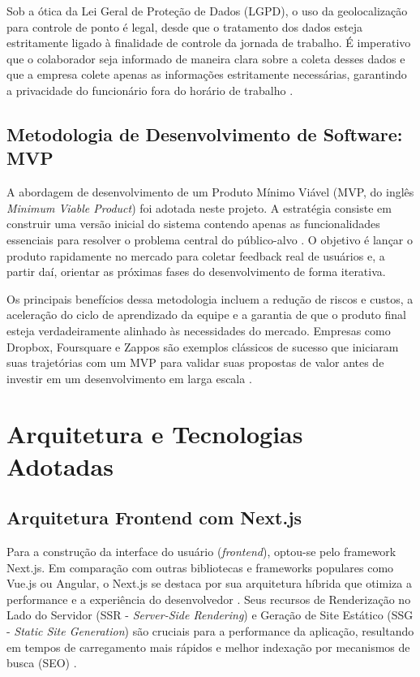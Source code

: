 \par Sob a ótica da Lei Geral de Proteção de Dados (LGPD), o uso da geolocalização para controle de ponto é legal, desde que o tratamento dos dados esteja estritamente ligado à finalidade de controle da jornada de trabalho. É imperativo que o colaborador seja informado de maneira clara sobre a coleta desses dados e que a empresa colete apenas as informações estritamente necessárias, garantindo a privacidade do funcionário fora do horário de trabalho \cite{LGPDeGeolocalizacao}.

\subsection{Metodologia de Desenvolvimento de Software: MVP}
\par A abordagem de desenvolvimento de um Produto Mínimo Viável (MVP, do inglês \textit{Minimum Viable Product}) foi adotada neste projeto. A estratégia consiste em construir uma versão inicial do sistema contendo apenas as funcionalidades essenciais para resolver o problema central do público-alvo \cite{MVP_RDStation}. O objetivo é lançar o produto rapidamente no mercado para coletar feedback real de usuários e, a partir daí, orientar as próximas fases do desenvolvimento de forma iterativa.

\par Os principais benefícios dessa metodologia incluem a redução de riscos e custos, a aceleração do ciclo de aprendizado da equipe e a garantia de que o produto final esteja verdadeiramente alinhado às necessidades do mercado. Empresas como Dropbox, Foursquare e Zappos são exemplos clássicos de sucesso que iniciaram suas trajetórias com um MVP para validar suas propostas de valor antes de investir em um desenvolvimento em larga escala \cite{ExemplosMVP}.

\section{Arquitetura e Tecnologias Adotadas}

\subsection{Arquitetura Frontend com Next.js}
\par Para a construção da interface do usuário (\textit{frontend}), optou-se pelo framework Next.js. Em comparação com outras bibliotecas e frameworks populares como Vue.js ou Angular, o Next.js se destaca por sua arquitetura híbrida que otimiza a performance e a experiência do desenvolvedor \cite{NextJsvsAngularVue_Brilworks}. Seus recursos de Renderização no Lado do Servidor (SSR - \textit{Server-Side Rendering}) e Geração de Site Estático (SSG - \textit{Static Site Generation}) são cruciais para a performance da aplicação, resultando em tempos de carregamento mais rápidos e melhor indexação por mecanismos de busca (SEO) \cite{SSReSSG}.

